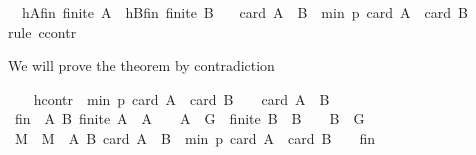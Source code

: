 \begin{isabellebody}
\ \ hAfin{\isacharcolon}{\kern0pt}\ {\isachardoublequoteopen}finite\ A{\isachardoublequoteclose}\ \ hBfin{\isacharcolon}{\kern0pt}\ {\isachardoublequoteopen}finite\ B{\isachardoublequoteclose}\isanewline
\ \ \ {\isachardoublequoteopen}card\ {\isacharparenleft}{\kern0pt}A\ {\isasymcdots}\ B{\isacharparenright}{\kern0pt}\ {\isasymge}\ min\ p\ {\isacharparenleft}{\kern0pt}card\ A\ {\isacharplus}{\kern0pt}\ card\ B\ {\isacharminus}{\kern0pt}\ {}{\isacharparenright}{\kern0pt}{\isachardoublequoteclose}\isanewline
%
\isadelimproof
%
\endisadelimproof
%
\isatagproof
{}\isamarkupfalse%
{\isacharparenleft}{\kern0pt}rule\ ccontr{\isacharparenright}{\kern0pt}%
\begin{isamarkuptext}%
We will prove the theorem by contradiction%
\end{isamarkuptext}\isamarkuptrue%
\ \ \isamarkupfalse%
\ hcontr{\isacharcolon}{\kern0pt}\ {\isachardoublequoteopen}{\isasymnot}\ min\ p\ {\isacharparenleft}{\kern0pt}card\ A\ {\isacharplus}{\kern0pt}\ card\ B\ {\isacharminus}{\kern0pt}\ {}{\isacharparenright}{\kern0pt}\ {\isasymle}\ card\ {\isacharparenleft}{\kern0pt}A\ {\isasymcdots}\ B{\isacharparenright}{\kern0pt}{\isachardoublequoteclose}\isanewline
\ \ \isamarkupfalse%
\ {\isacharquery}{\kern0pt}fin\ {\isacharequal}{\kern0pt}\ {\isachardoublequoteopen}{\isacharbraceleft}{\kern0pt}{\isacharparenleft}{\kern0pt}A{\isacharcomma}{\kern0pt}\ B{\isacharparenright}{\kern0pt}{\isachardot}{\kern0pt}\ finite\ A\ {\isasymand}\ A\ {\isasymnoteq}\ {\isacharbraceleft}{\kern0pt}{\isacharbraceright}{\kern0pt}\ {\isasymand}\ A\ {\isasymsubseteq}\ G\ {\isasymand}\ finite\ B\ {\isasymand}\ B\ {\isasymnoteq}\ {\isacharbraceleft}{\kern0pt}{\isacharbraceright}{\kern0pt}\ {\isasymand}\ B\ {\isasymsubseteq}\ G{\isacharbraceright}{\kern0pt}{\isachardoublequoteclose}\isanewline
\ \ \isamarkupfalse%
\ M\ \ {\isachardoublequoteopen}M\ {\isacharequal}{\kern0pt}\ {\isacharbraceleft}{\kern0pt}{\isacharparenleft}{\kern0pt}A{\isacharcomma}{\kern0pt}\ B{\isacharparenright}{\kern0pt}{\isachardot}{\kern0pt}\ card\ {\isacharparenleft}{\kern0pt}A\ {\isasymcdots}\ B{\isacharparenright}{\kern0pt}\ {\isacharless}{\kern0pt}\ min\ p\ {\isacharparenleft}{\kern0pt}card\ A\ {\isacharplus}{\kern0pt}\ card\ B\ {\isacharminus}{\kern0pt}\ {}{\isacharparenright}{\kern0pt}{\isacharbraceright}{\kern0pt}\ {\isasyminter}\ {\isacharquery}{\kern0pt}fin{\isachardoublequoteclose}\isanewline
\ \ \isamarkupfalse%

\end{isabellebody}

